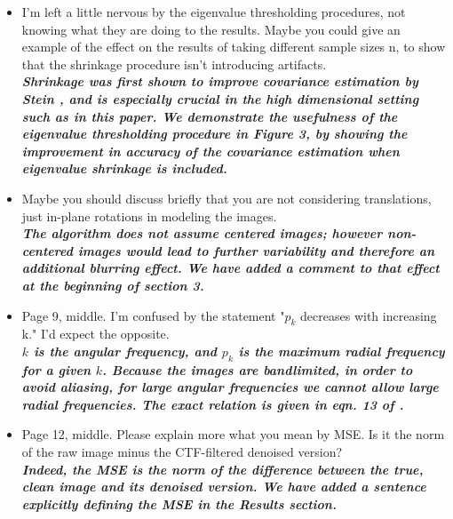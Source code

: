 \documentclass{article}
\begin{document}
\begin{itemize}
\item  I'm left a little nervous by the eigenvalue thresholding procedures, not 
knowing what they are doing to the results.  Maybe you could give an example of 
the effect on the results of taking different sample sizes n, to show that the 
shrinkage procedure isn't introducing artifacts.\\
\textbf{\textit{Shrinkage was first shown
to improve covariance estimation by Stein \cite{stein1, stein2}, and is especially crucial in the high dimensional
setting \cite{donoho} such as in this paper.
We demonstrate the usefulness of the eigenvalue thresholding procedure in Figure 3, by showing
the improvement in accuracy of the covariance estimation when eigenvalue shrinkage is included. }}


\item  Maybe you should discuss briefly that you are not considering 
translations, just in-plane rotations in modeling the images.\\
\textbf{\textit{The algorithm does not assume centered images; however non-centered images
would lead to further variability and therefore an additional blurring effect. We have added a comment to that
effect at the beginning of section 3. }}


\item  Page 9, middle.  I'm confused by the statement "$p_k$ decreases with 
increasing k."   I'd expect the opposite.\\
\textbf{\textit{ $k$ is the angular frequency, and $p_k$ is the maximum radial frequency for a given $k$. 
Because the images are bandlimited, in order to avoid aliasing, for large angular frequencies we cannot allow large radial frequencies.
The exact relation is given in eqn. 13 of \cite{ffbspca}.}}

\item  Page 12, middle.  Please explain more what you mean by MSE.  Is it the 
norm of the raw image minus the CTF-filtered denoised version?\\
\textbf{\textit{Indeed, the MSE is the norm of the difference between the true, clean image and its denoised version. We have added a sentence
explicitly defining the MSE in the Results section.}}
\end{itemize}


\end{document}
